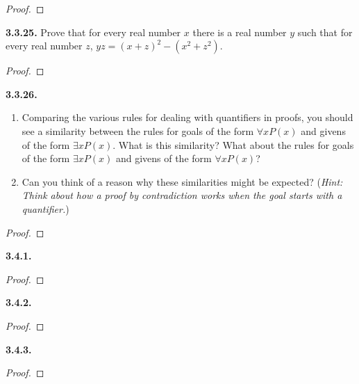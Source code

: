 \documentclass[12pt]{amsart}
\newenvironment{statement}[1]{\smallskip\noindent\color[rgb]{.6627, .3529, .6314} {\bf #1.}}{}
\theoremstyle{definition}
\theoremstyle{remark}
\begin{document}
\begin{proof}
\end{proof}


\begin{statement}{3.3.25}
Prove that for every real number $x$ there is a real number $y$ such that for every real number $z$, $yz = (x + z)^2 - (x^2 + z^2)$.
\end{statement}

\begin{proof}
\end{proof}


\begin{statement}{3.3.26}
\begin{enumerate}
	\item Comparing the various rules for dealing with quantifiers in proofs,
	you should see a similarity between the rules for goals of the form $\forall x P(x)$
	and givens of the form $\exists x P(x)$.
	What is this similarity?
	What about the rules for goals of the form $\exists x P(x)$ and givens of the form $\forall x P(x)$?
	
	\item Can you think of a reason why these similarities might be expected?
	(\emph{Hint: Think about how a proof by contradiction works when
	the goal starts with a quantifier.})
\end{enumerate}
\end{statement}

\begin{proof}
\end{proof}


\begin{statement}{3.4.1}
\end{statement}

\begin{proof}
\end{proof}


\begin{statement}{3.4.2}
\end{statement}

\begin{proof}
\end{proof}


\begin{statement}{3.4.3}
\end{statement}

\begin{proof}
\end{proof}
\end{document}
